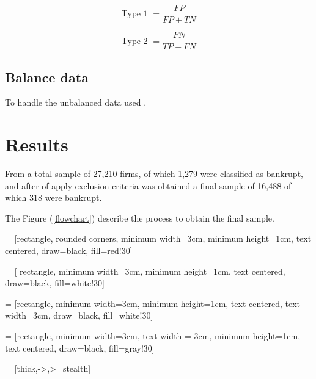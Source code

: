 \documentclass[journal]{IEEEtai}
\begin{document}
\begin{equation}
\text{Type 1 } = \frac{FP}{FP + TN}
\end{equation}


\begin{equation}
\text{Type 2 } = \frac{FN}{TP + FN}
\end{equation}


	

\subsection{Balance data}
To handle the unbalanced data used .


\section{Results}

From  a total sample of 27,210 firms, of which 1,279 were classified as bankrupt, and after of apply exclusion criteria was obtained a final sample of 16,488 of which 318 were bankrupt.


The Figure (\ref{flowchart}) describe the process to obtain the final sample.


\usetikzlibrary{shapes.geometric, arrows}

 = [rectangle, rounded corners, 
minimum width=3cm, 
minimum height=1cm,
text centered, 
draw=black, 
fill=red!30]

 = [ rectangle, minimum width=3cm, 
minimum height=1cm, text centered, 
draw=black, fill=white!30]

 = [rectangle, 
minimum width=3cm, 
minimum height=1cm, 
text centered, 
text width=3cm, 
draw=black, 
fill=white!30]

 = [rectangle, 
minimum width=3cm, 
text width = 3cm,
minimum height=1cm, 
text centered, 
draw=black, 
fill=gray!30]

 = [thick,->,>=stealth]
\end{document}

